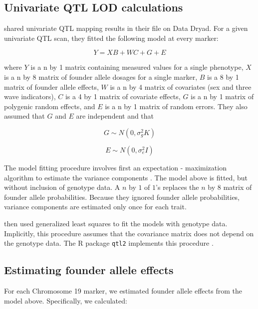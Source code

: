 \documentclass{article}
\begin{document}
\subsection{Univariate QTL LOD calculations}

\citet{keller2018genetic} shared univariate QTL mapping results in their file on Data Dryad. For a given univariate QTL scan, they fitted the following model at every marker:

\begin{equation}
Y = XB + WC + G + E
\end{equation}

\noindent where $Y$ is a n by 1 matrix containing measured values for a single phenotype, $X$ is a n by 8 matrix of founder allele dosages for a single marker, $B$ is a 8 by 1 matrix of founder allele effects, $W$ is a n by 4 matrix of covariates (sex and three wave indicators), $C$ is a 4 by 1 matrix of covariate effects, $G$ is a n by 1 matrix of polygenic random effects, and $E$ is a n by 1 matrix of random errors. They also assumed that $G$ and $E$ are independent and that 

\begin{equation}
G \sim N(0, \sigma_g^2K)
\end{equation}

\begin{equation}
E \sim N(0, \sigma_e^2I)
\end{equation}


The model fitting procedure involves first an expectation - maximization algorithm to estimate the variance components \citep{broman2018}. The model above is fitted, but without inclusion of genotype data. A $n$ by $1$ of $1$'s replaces the $n$ by $8$ matrix of founder allele probabilities. Because they ignored founder allele probabilities, variance components are estimated only once for each trait. 

\citet{keller2018genetic} then used generalized least squares to fit the models with genotype data. Implicitly, this procedure assumes that the covariance matrix does not depend on the genotype data. The R package \texttt{qtl2} implements this procedure \citep{broman2018}. 

\subsection{Estimating founder allele effects}

For each Chromosome 19 marker, we estimated founder allele effects from the model above. Specifically, we calculated:
\end{document}

